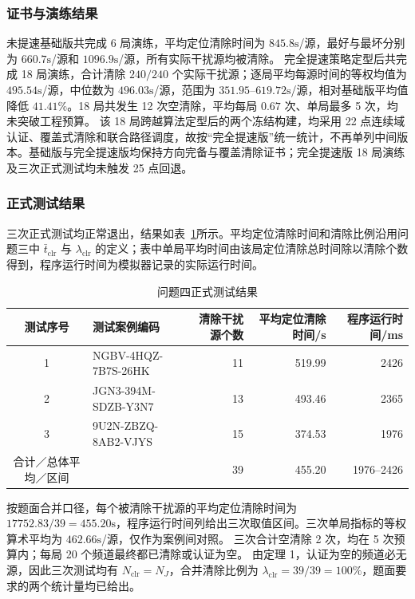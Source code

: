 \subsubsection{证书与演练结果}

未提速基础版共完成 6 局演练，平均定位清除时间为 $845.8\mathrm{s}$/源，最好与最坏分别为 $660.7\mathrm{s}$/源和 $1096.9\mathrm{s}$/源，所有实际干扰源均被清除。
完全提速策略定型后共完成 18 局演练，合计清除 $240/240$ 个实际干扰源；逐局平均每源时间的等权均值为 $495.54\mathrm{s}$/源，中位数为 $496.03\mathrm{s}$/源，范围为 $351.95$--$619.72\mathrm{s}$/源，相对基础版平均值降低 $41.41\%$。18 局共发生 12 次空清除，平均每局 $0.67$ 次、单局最多 5 次，均未突破工程预算。
该 18 局跨越算法定型后的两个冻结构建，均采用 22 点连续域认证、覆盖式清除和联合路径调度，故按“完全提速版”统一统计，不再单列中间版本。基础版与完全提速版均保持方向完备与覆盖清除证书；完全提速版 18 局演练及三次正式测试均未触发 25 点回退。

\subsubsection{正式测试结果}

三次正式测试均正常退出，结果如表~\ref{tab:q4_formal}所示。平均定位清除时间和清除比例沿用问题三中 $\bar t_{\mathrm{clr}}$ 与 $\lambda_{\mathrm{clr}}$ 的定义；表中单局平均时间由该局定位清除总时间除以清除个数得到，程序运行时间为模拟器记录的实际运行时间。

\begin{table}[htbp]
\centering
\caption{问题四正式测试结果}
\label{tab:q4_formal}
\small
\setlength{\tabcolsep}{2pt}
\begin{tabular}{@{}clrrr@{}}
\toprule
测试序号 & 测试案例编码 & 清除干扰源个数 & 平均定位清除时间/s & 程序运行时间/ms \\
\midrule
1 & NGBV-4HQZ-7B7S-26HK & 11 & 519.99 & 2426 \\
2 & JGN3-394M-SDZB-Y3N7 & 13 & 493.46 & 2365 \\
3 & 9U2N-ZBZQ-8AB2-VJYS & 15 & 374.53 & 1976 \\
\midrule
合计／总体平均／区间 &  & 39 & 455.20 & 1976--2426 \\
\bottomrule
\end{tabular}
\end{table}



按题面合并口径，每个被清除干扰源的平均定位清除时间为 $17752.83/39=455.20\mathrm{s}$，程序运行时间列给出三次取值区间。三次单局指标的等权算术平均为 $462.66\mathrm{s}$/源，仅作为案例间对照。
三次合计空清除 2 次，均在 5 次预算内；每局 20 个频道最终都已清除或认证为空。
由定理 1，认证为空的频道必无源，因此三次测试均有 $N_{\mathrm{clr}}=N_J$，合并清除比例为 $\lambda_{\mathrm{clr}}=39/39=100\%$，题面要求的两个统计量均已给出。


